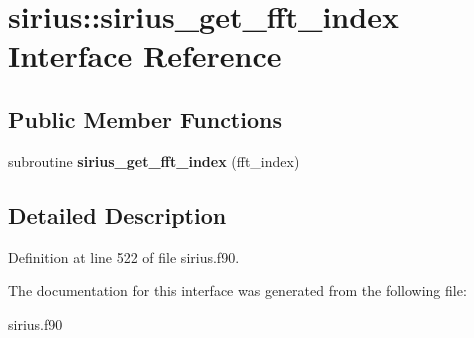 \hypertarget{interfacesirius_1_1sirius__get__fft__index}{}\section{sirius\+:\+:sirius\+\_\+get\+\_\+fft\+\_\+index Interface Reference}
\label{interfacesirius_1_1sirius__get__fft__index}
\subsection*{Public Member Functions}
\begin{DoxyCompactItemize}
\item 
\hypertarget{interfacesirius_1_1sirius__get__fft__index_ad952dfc0bedc2d97f58be504eb7f1e81}{}subroutine {\bfseries sirius\+\_\+get\+\_\+fft\+\_\+index} (fft\+\_\+index)\label{interfacesirius_1_1sirius__get__fft__index_ad952dfc0bedc2d97f58be504eb7f1e81}

\end{DoxyCompactItemize}


\subsection{Detailed Description}


Definition at line 522 of file sirius.\+f90.



The documentation for this interface was generated from the following file\+:\begin{DoxyCompactItemize}
\item 
sirius.\+f90\end{DoxyCompactItemize}
